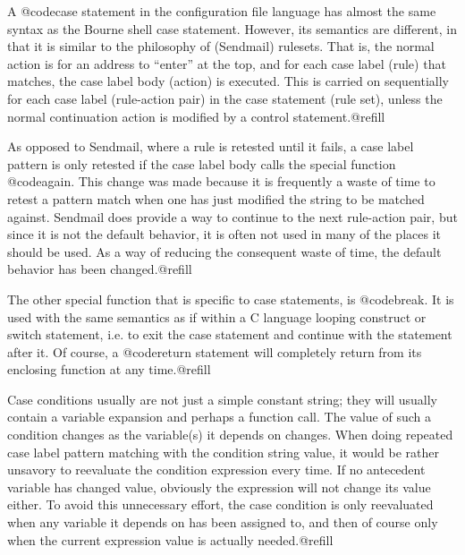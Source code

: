 {A @code{case} statement in the configuration file language has almost the
same syntax as the Bourne shell case statement.  However, its semantics are
different, in that it is similar to the philosophy of (Sendmail) rulesets.
That is, the normal action is for an address to ``enter'' at the top, and for
each case label (rule) that matches, the case label body (action) is
executed.  This is carried on sequentially for each case label (rule-action
pair) in the case statement (rule set), unless the normal continuation action
is modified by a control statement.@refill

As opposed to Sendmail, where a rule
is retested until it fails, a case label pattern is only retested if the
case label body calls the special function @code{again}.  This change was made
because it is frequently a waste of time to retest a pattern match when one
has just modified the string to be matched against.  Sendmail does provide a
way to continue to the next rule-action pair, but since it is not the default
behavior, it is often not used in many of the places it should be used.  As
a way of reducing the consequent waste of time, the default behavior has been
changed.@refill

The other special function that is specific to case statements, is @code{break}.
It is used with the same semantics as if within a C language looping construct
or switch statement, i.e. to exit the case statement and continue with the
statement after it.  Of course, a @code{return} statement will completely
return from its enclosing function at any time.@refill

Case conditions usually are not just a simple constant string; they will
usually contain a variable expansion and perhaps a function call.
The value of such a condition changes as the variable(s) it depends on
changes.  When doing repeated case label pattern matching with the condition
string value, it would be rather unsavory to reevaluate the condition
expression every time.  If no antecedent variable has changed value,
obviously the expression will not change its value either.  To avoid
this unnecessary effort, the case condition is only reevaluated when any
variable it depends on has been assigned to, and then of course only when the
current expression value is actually needed.@refill

}

